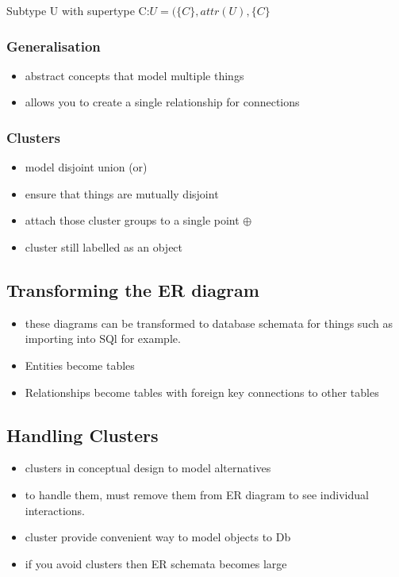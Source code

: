 \documentclass{article}
\newcommand\tab[1][0.5cm]{\hspace*{#1}}
\begin{document}
			Subtype U with supertype C:\tab\tab $U = (\{C\}, attr(U),\{C\}$

		\subsubsection{Generalisation}
			\begin{itemize}
				\item abstract concepts that model multiple things
				\item allows you to create a single relationship for connections
			\end{itemize}

		\subsubsection{Clusters}
			\begin{itemize}
				\item model disjoint union (or)
				\item ensure that things are mutually disjoint
				\item attach those cluster groups to a single point $\oplus$
				\item cluster still labelled as an object
			\end{itemize}

	\subsection{Transforming the ER diagram}
		\begin{itemize}
			\item these diagrams can be transformed to database schemata for things such as importing into SQl for example.
			\item Entities become tables
			\item Relationships become tables with foreign key connections to other tables
		\end{itemize}

	\subsection{Handling Clusters}
		\begin{itemize}
			\item clusters in conceptual design to model alternatives
			\item to handle them, must remove them from ER diagram to see individual interactions.
			\item cluster provide convenient way to model objects to Db
			\item if you avoid clusters then ER schemata becomes large
		\end{itemize}
\end{document}
